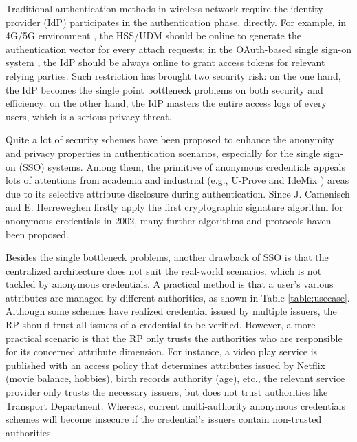 \documentclass[journal]{IEEEtran}
\begin{document}
Traditional authentication methods in wireless network require the identity provider (IdP) participates in the authentication phase, directly. For example, in 4G/5G environment \cite{3gpp.33.102, 3gpp.33.401, 3gpp.33.501}, the HSS/UDM should be online to generate the authentication vector for every attach requests; in the OAuth-based single sign-on system \cite{rfc6749, recordon2006openid}, the IdP should be always online to grant access tokens for relevant relying parties. Such restriction has brought two security risk: on the one hand, the IdP becomes the single point bottleneck problems on both security and efficiency; on the other hand, the IdP masters the entire access logs of every users, which is a serious privacy threat. 

Quite a lot of security schemes have been proposed to enhance the anonymity and privacy properties in authentication scenarios, especially for the single sign-on (SSO) systems. Among them, the primitive of anonymous credentials appeals lots of attentions from academia and industrial (e.g., U-Prove \cite{paquin2011u} and IdeMix \cite{camenisch2004signature}) areas due to its selective attribute disclosure during authentication. Since J. Camenisch and E. Herreweghen firstly apply the first cryptographic signature algorithm \cite{camenisch2002design} for anonymous credentials in 2002, many further algorithms \cite{camenisch2004signature, pointcheval2016short} and protocols \cite{elpasso, yu2020blockchainbased} haven been proposed.

Besides the single bottleneck problems, another drawback of SSO is that the centralized architecture does not suit the real-world scenarios, which is not tackled by anonymous credentials. A practical method is that a user's various attributes are managed by different authorities, as shown in Table \ref{table:usecase}. Although some schemes have realized credential issued by multiple issuers, the RP should trust all issuers of a credential to be verified. However, a more practical scenario is that the RP only trusts the authorities who are responsible for its concerned attribute dimension. For instance, a video play service is published with an access policy that determines attributes issued by Netflix (movie balance, hobbies), birth records authority (age), etc., the relevant service provider only trusts the necessary issuers, but does not trust authorities like Transport Department. Whereas, current multi-authority anonymous credentials schemes will become insecure if the credential's issuers contain non-trusted authorities. 
\end{document}
